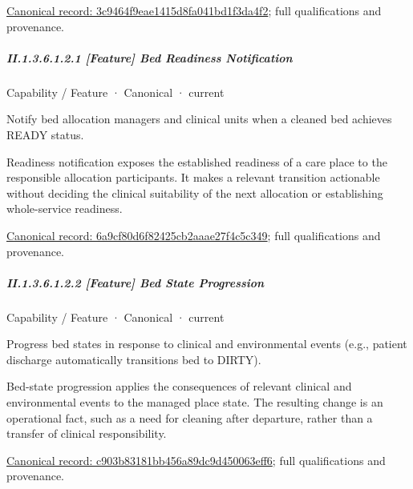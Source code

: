 {\footnotesize \href{../../../../continuum/strategy/capability/3c9464f9eae1415d8fa041bd1f3da4f2.md}{Canonical record: 3c9464f9eae1415d8fa041bd1f3da4f2}; full qualifications and provenance.}\par
\subparagraph*{II.1.3.6.1.2.1 [Feature] Bed Readiness Notification}
\label{navigation:II.1.3.6.1.2.1}

\label{element:6a9cf80d6f82425cb2aaae27f4c5c349}
{\small Capability / Feature · Canonical · current}\par

Notify bed allocation managers and clinical units when a cleaned bed achieves READY status.



Readiness notification exposes the established readiness of a care place to the responsible allocation participants. It makes a relevant transition actionable without deciding the clinical suitability of the next allocation or establishing whole-service readiness.


{\footnotesize \href{../../../../continuum/strategy/capability/feature/6a9cf80d6f82425cb2aaae27f4c5c349.md}{Canonical record: 6a9cf80d6f82425cb2aaae27f4c5c349}; full qualifications and provenance.}\par
\subparagraph*{II.1.3.6.1.2.2 [Feature] Bed State Progression}
\label{navigation:II.1.3.6.1.2.2}

\label{element:c903b83181bb456a89dc9d450063eff6}
{\small Capability / Feature · Canonical · current}\par

Progress bed states in response to clinical and environmental events (e.g., patient discharge automatically transitions bed to DIRTY).



Bed-state progression applies the consequences of relevant clinical and environmental events to the managed place state. The resulting change is an operational fact, such as a need for cleaning after departure, rather than a transfer of clinical responsibility.


{\footnotesize \href{../../../../continuum/strategy/capability/feature/c903b83181bb456a89dc9d450063eff6.md}{Canonical record: c903b83181bb456a89dc9d450063eff6}; full qualifications and provenance.}\par
